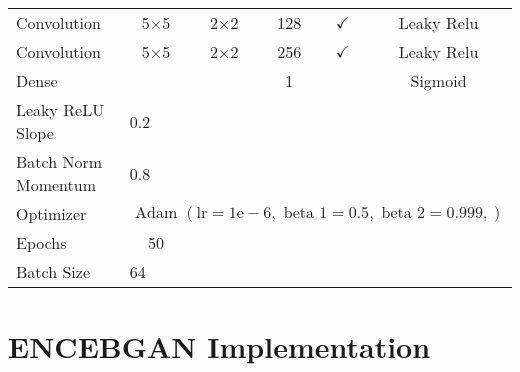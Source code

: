\begin{longtable}[c]{@{}lccccc@{}}
	Convolution & \multicolumn{1}{c}{5$\times$5} & 2$\times$2 & 128 & $\checkmark$ & Leaky Relu \\
	Convolution & \multicolumn{1}{c}{5$\times$5} & 2$\times$2 & 256 & $\checkmark$ & Leaky Relu \\
	Dense & \multicolumn{1}{c}{} &  & 1 &  & Sigmoid \\ \hline
	Leaky ReLU Slope & \multicolumn{5}{l}{0.2} \\
	Batch Norm Momentum & \multicolumn{5}{l}{0.8} \\
	Optimizer & \multicolumn{5}{l}{$\text { Adam }(\mathrm{lr}=1 \mathrm{e}-6, \text { beta } 1=0.5, \text { beta } 2=0.999,)$} \\ \hline
	Epochs & 50 & \multicolumn{1}{l}{} & \multicolumn{1}{l}{} & \multicolumn{1}{l}{} & \multicolumn{1}{l}{} \\
	Batch Size & \multicolumn{5}{l}{64}
\end{longtable}

\section{ENCEBGAN Implementation}


